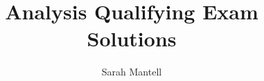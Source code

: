 \documentclass[
    letterpaper,
    fontsize=12pt,
    twoside=false,
    secnumdepth=1
]{kaonotes}
\begin{document}
    \title[Analysis Qualifying Exam Solutions]{Analysis Qualifying Exam Solutions}

    \author{Sarah Mantell}
    
    \frontmatter
    \maketitle

    \mainmatter
    
    
    
\end{document}
